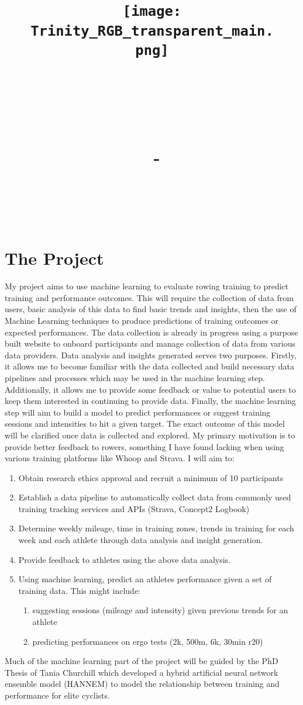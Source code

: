 \documentclass[a4paper]{article}
\title{
    \vspace{-1in}
    \begin{figure}[!ht]
    \flushleft
    \texttt{[image: Trinity\_RGB\_transparent\_main.png]}
    \end{figure}
    \vspace{-0.5cm}
    \hrulefill \\
    \vspace{1cm}
    \textmd{\textbf{\moduleCode\ \moduleName}}\\
    \textmd{\textbf{\assignmentTitle}}\\
    {
        \large
        \textmd{\authorName\ - \authorID}\\
        \textmd{\reportDate}\\
    }
    \vspace{0.5cm}
    \hrulefill \\
}
\date{}
\author{}
\begin{document}
\section{The Project}
My project aims to use machine learning to evaluate rowing training to predict training and performance outcomes. This will require the collection of data from users, basic analysis of this data to find basic trends and insights, then the use of Machine Learning techniques to produce predictions of training outcomes or expected performances. 
The data collection is already in progress using a purpose built website to onboard participants and manage collection of data from various data providers. 
Data analysis and insights generated serves two purposes. Firstly, it allows me to become familiar with the data collected and build necessary data pipelines and processes which may be used in the machine learning step. Additionally, it allows me to provide some feedback or value to potential users to keep them interested in continuing to provide data. 
Finally, the machine learning step will aim to build a model to predict performances or suggest training sessions and intensities to hit a given target. The exact outcome of this model will be clarified once data is collected and explored. My  primary motivation is to provide better feedback to rowers, something I have found lacking when using various training platforms like Whoop and Strava.
I will aim to:
\begin{enumerate}
    \item Obtain research ethics approval and recruit a minimum of 10 participants
    \item Establish a data pipeline to automatically collect data from commonly used training tracking services and APIs (Strava, Concept2 Logbook)
    \item Determine weekly mileage, time in training zones, trends in training for each week and each athlete through data analysis and insight generation.
    \item Provide feedback to athletes using the above data analysis.
    \item Using machine learning, predict an athletes performance given a set of training data. This might include:
    \begin{enumerate}
        \item suggesting sessions (mileage and intensity) given previous trends for an athlete
        \item predicting performances on ergo tests (2k, 500m, 6k, 30min r20)
    \end{enumerate}
\end{enumerate}
Much of the machine learning part of the project will be guided by the PhD Thesis of Tania Churchill \autocite{Churchill2014} which developed a hybrid artificial neural network ensemble model (HANNEM) to model the relationship between training and performance for elite cyclists.
\end{document}
